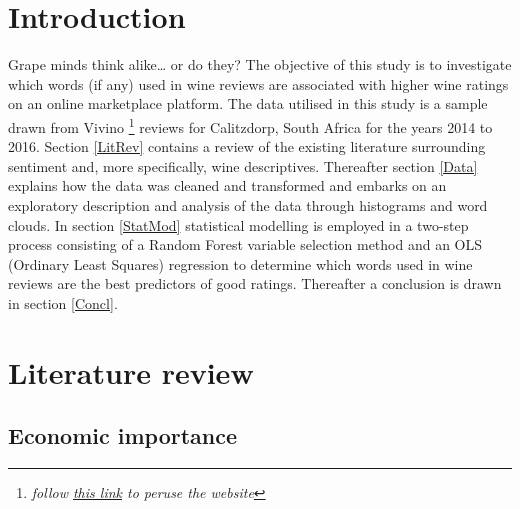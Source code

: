 \documentclass[11pt,preprint]{elsarticle}
\numberwithin{equation}{section}
\numberwithin{figure}{section}
\numberwithin{table}{section}
\let\rmarkdownfootnote\footnote%
\def\footnote{\protect\rmarkdownfootnote}
\begin{document}
\setcounter{footnote}{0}



\pagestyle{fancy}
\chead{}
\rhead{}
\lhead{\leftmark}
\cfoot{}


\headsep 35pt %




\newpage

\section{Introduction}\label{introduction}

\label{Intro}

Grape minds think alike\ldots{} or do they? The objective of this study
is to investigate which words (if any) used in wine reviews are
associated with higher wine ratings on an online marketplace platform.
The data utilised in this study is a sample drawn from Vivino
\footnote{\emph{follow \href{https://www.vivino.com/}{this link} to
  peruse the website}} reviews for Calitzdorp, South Africa for the
years 2014 to 2016. Section \ref{LitRev} contains a review of the
existing literature surrounding sentiment and, more specifically, wine
descriptives. Thereafter section \ref{Data} explains how the data was
cleaned and transformed and embarks on an exploratory description and
analysis of the data through histograms and word clouds. In section
\ref{StatMod} statistical modelling is employed in a two-step process
consisting of a Random Forest variable selection method and an OLS
(Ordinary Least Squares) regression to determine which words used in
wine reviews are the best predictors of good ratings. Thereafter a
conclusion is drawn in section \ref{Concl}.

\newpage

\section{Literature review}\label{literature-review}

\label{LitRev}

\subsection{Economic importance}\label{economic-importance}
\end{document}
